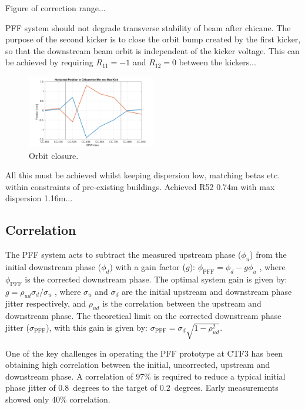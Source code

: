 \documentclass[%
 reprint,
 amsmath,amssymb,
 aps,
]{revtex4-1}
\begin{document}
Figure of correction range...

PFF system should not degrade transverse stability of beam after chicane. The 
purpose of the second kicker is to close the orbit bump created by the first 
kicker, so that the downstream beam orbit is independent of the kicker voltage. 
This can be achieved by requiring \(R_{11}=-1\) and \(R_{12}=0\) between the 
kickers...

\begin{figure}
	\includegraphics[width=0.5\textwidth]{figs/orbClos}
	\caption{\label{fig:orbClos}Orbit closure.}
\end{figure}

All this must be achieved whilst keeping dispersion low, matching betas etc. 
within constraints of pre-existing buildings. Achieved R52 0.74m with max 
dispersion 1.16m...

\subsection{\label{ss:r56} Correlation}

The PFF system acts to subtract the measured upstream phase (\(\phi_u\)) from 
the initial downstream phase (\(\phi_d\)) with a gain factor (\(g\)):
\(\phi_{\mathrm{PFF}} = \phi_d - g\phi_u\)
, where \(\phi_{\mathrm{PFF}}\) is the corrected downstream phase. The optimal 
system gain is given by:
\(g = \rho_{ud} \sigma_d/\sigma_u\)
, where \(\sigma_u\) and \(\sigma_d\) are the initial upstream and downstream 
phase jitter respectively, and \(\rho_{ud}\) is the correlation between the 
upstream and downstream phase. The theoretical limit on the corrected 
downstream phase jitter (\(\sigma_{\mathrm{PFF}}\)), with this gain is given by:
\(\sigma_{\mathrm{PFF}}=\sigma_d \sqrt{1-\rho_{ud}^2}\). 

One of the key challenges in operating the PFF prototype at CTF3 has been 
obtaining high correlation between the initial, uncorrected, upstream and 
downstream phase. A correlation of 97\% is required to reduce a typical initial 
phase jitter of \(0.8\)~degrees to the target of \(0.2\)~degrees. Early 
measurements showed only 40\% correlation.
\end{document}
